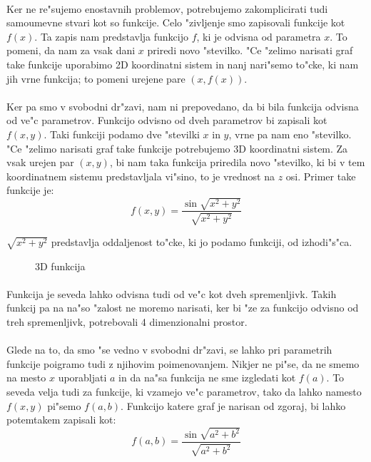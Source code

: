 \paragraph{}
Ker ne re"sujemo enostavnih problemov, potrebujemo zakomplicirati tudi samoumevne stvari kot so funkcije. Celo "zivljenje smo zapisovali funkcije kot $f(x)$. Ta zapis nam predstavlja funkcijo $f$, ki je odvisna od parametra $x$. To pomeni, da nam za vsak dani $x$ priredi novo "stevilko. "Ce "zelimo narisati graf take funkcije uporabimo 2D koordinatni sistem in nanj nari"semo to"cke, ki nam jih vrne funkcija; to pomeni urejene pare $(x, f(x))$.

\paragraph{}
Ker pa smo v svobodni dr"zavi, nam ni prepovedano, da bi bila funkcija odvisna od ve"c parametrov. Funkcijo odvisno od dveh parametrov bi zapisali kot $f(x,y)$. Taki funkciji podamo dve "stevilki $x$ in $y$, vrne pa nam eno "stevilko. "Ce "zelimo narisati graf take funkcije potrebujemo 3D koordinatni sistem. Za vsak urejen par $(x,y)$, bi nam taka funkcija priredila novo "stevilko, ki bi v tem koordinatnem sistemu predstavljala vi"sino, to je vrednost na $z$ osi. Primer take funkcije je:
\[f(x,y) = \frac{\sin \sqrt{x^2 + y^2}}{\sqrt{x^2 + y^2}} \]

$\sqrt{x^2 + y^2}$ predstavlja oddaljenost to"cke, ki jo podamo funkciji, od izhodi"s"ca.

\begin{figure}[h!]
	\centering
	\caption{3D funkcija}
\end{figure}

\paragraph{}
Funkcija je seveda lahko odvisna tudi od ve"c kot dveh spremenljivk. Takih funkcij pa na na"so "zalost ne moremo narisati, ker bi "ze za funkcijo odvisno od treh spremenljivk, potrebovali 4 dimenzionalni prostor.

\paragraph{}
Glede na to, da smo "se vedno v svobodni dr"zavi, se lahko pri parametrih funkcije poigramo tudi z njihovim poimenovanjem. Nikjer ne pi"se, da ne smemo na mesto $x$ uporabljati $a$ in da na"sa funkcija ne sme izgledati kot $f(a)$. To seveda velja tudi za funkcije, ki vzamejo ve"c parametrov, tako da lahko namesto $f(x,y)$ pi"semo $f(a,b)$. Funkcijo katere graf je narisan od zgoraj, bi lahko potemtakem zapisali kot:
\[f(a,b) = \frac{\sin \sqrt{a^2 + b^2}}{\sqrt{a^2 + b^2}} \]

